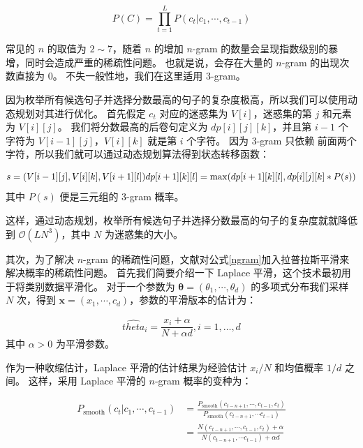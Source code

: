 \begin{equation}
	P(C) = \prod_{t=1}^L P(c_t | c_1, \cdots, c_{t-1})
\end{equation}

常见的 $n$ 的取值为 $2 \sim 7$，随着 $n$ 的增加 $n$-gram 的数量会呈现指数级别的暴增，同时会造成严重的稀疏性问题。
也就是说，会存在大量的 $n$-gram 的出现次数直接为 $0$。
不失一般性地，我们在这里适用 $3$-gram。

因为枚举所有候选句子并选择分数最高的句子的复杂度极高，所以我们可以使用动态规划对其进行优化。
首先假定 $c_t$ 对应的迷惑集为 $V[i]$，迷惑集的第 $j$ 和元素为 $V[i][j]$。
我们将分数最高的后卷句定义为 $dp[i][j][k]$，并且第 $i-1$ 个字符为 $V[i-1][j]$，$V[i][k]$ 就是第 $i$ 个字符。
因为 $3$-gram 只依赖 前面两个字符，所以我们就可以通过动态规划算法得到状态转移函数：

\begin{equation}
	s = (V[i-1][j], V[i][k], V[i+1][l]) \\
	dp[i+1][k][l] = \max(dp[i+1][k][l], dp[i][j][k] * P(s))
\end{equation}
其中 $P(s)$ 便是三元组的 $3$-gram 概率。

这样，通过动态规划，枚举所有候选句子并选择分数最高的句子的复杂度就就降低到 $\mathcal{O}(LN^3)$，其中 $N$ 为迷惑集的大小。

其次，为了解决 $n$-gram 的稀疏性问题，文献\cite{huang2014chinese}对公式\ref{ngram}加入拉普拉斯平滑来解决概率的稀疏性问题。
首先我们简要介绍一下 Laplace 平滑，这个技术最初用于将类别数据平滑化。
对于一个参数为 $\bm{\theta} = (\theta_1, \cdots, \theta_d)$ 的多项式分布我们采样 $N$ 次，得到 $\bm{x} = (x_1, \cdots, c_d)$，参数的平滑版本的估计为：

\begin{equation}
	\hat{theta}_i = \frac{x_i + \alpha}{N + \alpha d}, i=1,\dots,d
\end{equation}
其中 $\alpha > 0$ 为平滑参数。

作为一种收缩估计，Laplace 平滑的估计结果为经验估计 $x_i / N$ 和均值概率 $1/d$ 之间。
这样，采用 Laplace 平滑的 $n$-gram 概率的变种为：

\begin{align}
	P_{\text{smooth}}(c_t | c_1, \cdots, c_{t-1}) &= \frac{P_{\text{smooth}}(c_{t-n+1}, \cdots, c_{t-1}, c_t)}{P_{\text{smooth}}(c_{t-n+1}, \cdots c_{t-1})} \nonumber \\
	&= \frac{N(c_{t-n+1}, \cdots, c_{t-1}, c_t) + \alpha}{N(c_{t-n+1}, \cdots c_{t-1}) + \alpha d}
\end{align}

